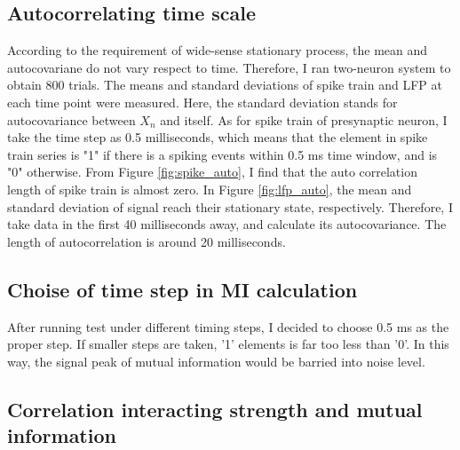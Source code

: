 \documentclass{article}
\begin{document}
		\subsection{Autocorrelating time scale}
			According to the requirement of wide-sense stationary process, the mean and autocovariane do not vary respect to time. Therefore, I ran two-neuron system to obtain 800 trials. The means and standard deviations of spike train and LFP at each time point were measured. Here, the standard deviation stands for autocovariance between $X_n$ and itself.
			As for spike train of presynaptic neuron, I take the time step as 0.5 milliseconds, which means that the element in spike train series is "1" if there is a spiking events within 0.5 ms time window, and is "0" otherwise. From Figure \ref{fig:spike_auto}, I find that the auto correlation length of spike train is almost zero.
			In Figure \ref{fig:lfp_auto}, the mean and standard deviation of signal reach their stationary state, respectively. Therefore, I take data in the first 40 milliseconds away, and calculate its autocovariance. The length of autocorrelation is around 20 milliseconds.

		\subsection{Choise of time step in MI calculation}
			After running test under different timing steps, I decided to choose 0.5 ms as the proper step. If smaller steps are taken, '1' elements is far too less than '0'. In this way, the signal peak of mutual information would be barried into noise level.

		\subsection{Correlation interacting strength and mutual information}
\end{document}
